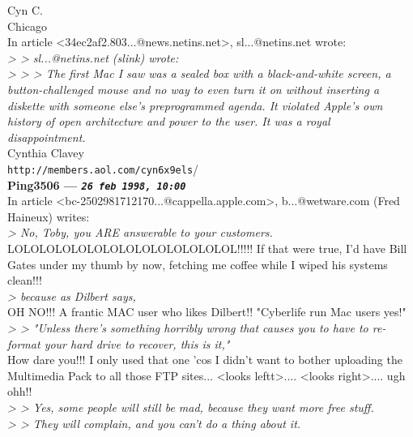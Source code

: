 \documentclass[11pt,twoside,a4paper]{article}
\begin{document}
\begin{multicols*}{2}
Cyn C.~\\
Chicago~\\

In article <34ec2af2.803...@news.netins.net>, sl...@netins.net wrote:~\\
\emph{> > sl...@netins.net (slink) wrote:}~\\
\emph{> > > The first Mac I saw was a sealed box with a black-and-white screen, a button-challenged mouse and no way to even turn it on without inserting a diskette with someone else's preprogrammed agenda.  It violated Apple's own history of open architecture and power to the user.  It was a royal disappointment.}~\\

Cynthia Clavey~\\
\texttt{http://members.aol.com/cyn6x9els}/~\\

 
		
	
		
\textbf{Ping3506 --- \emph{\texttt{26 feb 1998, 10:00}}}~\\

In article <bc-2502981712170...@cappella.apple.com>, b...@wetware.com (Fred Haineux) writes:~\\
\emph{> No, Toby, you ARE answerable to your customers.}~\\

LOLOLOLOLOLOLOLOLOLOLOLOLOLOL!!!!! If that were true, I'd have Bill Gates under my thumb by now, fetching me coffee while I wiped his systems clean!!!~\\

\emph{> because as Dilbert says,}~\\

OH NO!!! A frantic MAC user who likes Dilbert!! "Cyberlife run Mac users yes!"~\\

\emph{> > "Unless there's something horribly wrong that causes you to have to re-format your hard drive to recover, this is it,"}~\\

How dare you!!! I only used that one 'cos I didn't want to bother uploading the Multimedia Pack to all those FTP sites... <looks leftt>.... <looks right>.... ugh ohh!!~\\

\emph{> > Yes, some people will still be mad, because they want more free stuff.}~\\
\emph{> > They will complain, and you can't do a thing about it.}~\\


\end{multicols*}
\end{document}
